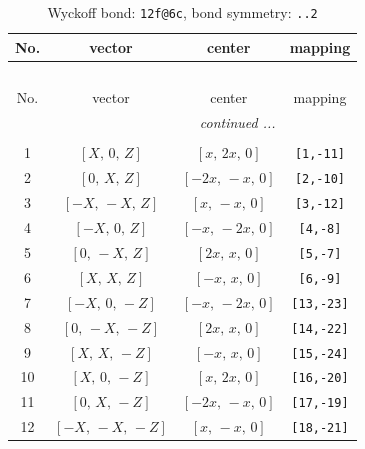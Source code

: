 \documentclass[fleqn,8pt]{jsarticle}
\begin{document}
\begin{longtable}{cccc}
\caption{Wyckoff bond: {\tt 12f@6c}, bond symmetry: {\tt ..2}}
 \\
 \hline \hline
No. & vector & center & mapping \\ \hline \endfirsthead

\multicolumn{3}{l}{\tablename\ \thetable{}} \\
 \hline \hline
No. & vector & center & mapping \\ \hline \endhead

 \hline \hline
\multicolumn{3}{r}{\footnotesize\it continued ...} \\ \endfoot

 \hline \hline
\multicolumn{3}{r}{} \\ \endlastfoot

1 & $\left[ X,\, 0,\, Z \right]$ & $\left[ x,\, 2 x,\, 0 \right]$ & {\tt [1,-11]} \\ \hline
2 & $\left[ 0,\, X,\, Z \right]$ & $\left[ - 2 x,\, - x,\, 0 \right]$ & {\tt [2,-10]} \\ \hline
3 & $\left[ - X,\, - X,\, Z \right]$ & $\left[ x,\, - x,\, 0 \right]$ & {\tt [3,-12]} \\ \hline
4 & $\left[ - X,\, 0,\, Z \right]$ & $\left[ - x,\, - 2 x,\, 0 \right]$ & {\tt [4,-8]} \\ \hline
5 & $\left[ 0,\, - X,\, Z \right]$ & $\left[ 2 x,\, x,\, 0 \right]$ & {\tt [5,-7]} \\ \hline
6 & $\left[ X,\, X,\, Z \right]$ & $\left[ - x,\, x,\, 0 \right]$ & {\tt [6,-9]} \\ \hline
7 & $\left[ - X,\, 0,\, - Z \right]$ & $\left[ - x,\, - 2 x,\, 0 \right]$ & {\tt [13,-23]} \\ \hline
8 & $\left[ 0,\, - X,\, - Z \right]$ & $\left[ 2 x,\, x,\, 0 \right]$ & {\tt [14,-22]} \\ \hline
9 & $\left[ X,\, X,\, - Z \right]$ & $\left[ - x,\, x,\, 0 \right]$ & {\tt [15,-24]} \\ \hline
10 & $\left[ X,\, 0,\, - Z \right]$ & $\left[ x,\, 2 x,\, 0 \right]$ & {\tt [16,-20]} \\ \hline
11 & $\left[ 0,\, X,\, - Z \right]$ & $\left[ - 2 x,\, - x,\, 0 \right]$ & {\tt [17,-19]} \\ \hline
12 & $\left[ - X,\, - X,\, - Z \right]$ & $\left[ x,\, - x,\, 0 \right]$ & {\tt [18,-21]} \\
\end{longtable}
\renewcommand{\arraystretch}{1.2}
\end{document}
